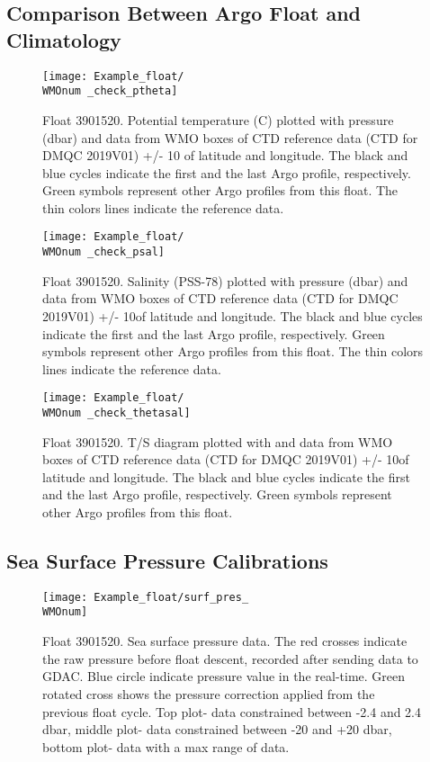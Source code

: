 \documentclass{article}
\newcommand{\WMOnum}{3901520} %
\begin{document}
\begin{flushleft}
\subsection{Comparison Between Argo Float and Climatology}
\begin{figure}[H]
    \centering    
    \texttt{[image: Example\_float/\\WMOnum \_check\_ptheta]}
    \caption{Float \WMOnum. Potential temperature (\textdegree C) plotted with pressure (dbar) and data from WMO boxes of CTD reference data (CTD for DMQC 2019V01) +/- 10 \textdegree of latitude and longitude. The black and blue cycles indicate the first and the last Argo profile, respectively. Green symbols represent other Argo profiles from this float. The thin colors lines indicate the reference data.}
    \label{TempPress}
\end{figure}
\begin{figure}[H]
    \centering    
    \texttt{[image: Example\_float/\\WMOnum \_check\_psal]}
    \caption{Float \WMOnum. Salinity (PSS-78) plotted with pressure (dbar) and data from WMO boxes of CTD reference data (CTD for DMQC 2019V01) +/- 10\textdegree of latitude and longitude. The black and blue cycles indicate the first and the last Argo profile, respectively. Green symbols represent other Argo profiles from this float. The thin colors lines indicate the reference data.}
    \label{SALPress}
\end{figure}
\begin{figure}[H]
    \centering    
    \texttt{[image: Example\_float/\\WMOnum \_check\_thetasal]}
    \caption{Float \WMOnum. T/S diagram plotted with and data from WMO boxes of CTD reference data (CTD for DMQC 2019V01) +/- 10\textdegree of latitude and longitude. The black and blue cycles indicate the first and the last Argo profile, respectively. Green symbols represent other Argo profiles from this float.}
    \label{ThetaS}
\end{figure}
\newpage
\subsection{Sea Surface Pressure Calibrations}

\begin{figure}[H]
\centering    
    \texttt{[image: Example\_float/surf\_pres\_\\WMOnum]}
    \caption{Float \WMOnum. Sea surface pressure data. The red crosses indicate the raw pressure before float descent, recorded after sending data to GDAC. Blue circle indicate pressure value in the real-time. Green rotated cross shows the pressure correction applied from the previous float cycle. Top plot- data constrained between -2.4 and 2.4 dbar, middle plot- data constrained between -20 and +20 dbar, bottom plot- data with a max range of data.}
    \label{surf_press}
\end{figure}


\end{flushleft}
\end{document}
